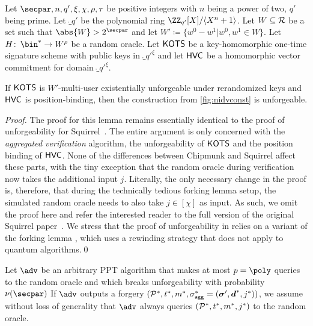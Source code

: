 \begin{lemma}\label{lem:msigunf}
Let $\secpar,n,q',\xi,\chi,\rho,\tau$ be positive integers with $n$ being a power of two, $q'$ being prime.
Let $\ring_{q'}$ be the polynomial ring $\defringqq$.
Let $W \subseteq \mathcal{R}$ be a set such that $\abs{W} > 2^\secpar$ and let $W' \coloneqq \{w^0-w^1| w^0,w^1 \in W\}$.
Let $H\colon\, \bin^* \to W^\rho$ be a random oracle.
Let $\mathsf{KOTS}$ be a key-homomorphic one-time signature scheme with public keys in $\ring_{q'}^\xi$ and let $\mathsf{HVC}$ be a homomorphic vector commitment for domain $\ring_{q'}^\xi$.

If $\mathsf{KOTS}$ is $W'$-multi-user existentially unforgeable under rerandomized keys and $\mathsf{HVC}$ is position-binding, then the construction from \autoref{fig:nidvconst} is unforgeable.
\end{lemma}

\begin{proof}
  The proof for this lemma remains essentially identical to the proof of unforgeability for Squirrel~\cite{CCS:FleSimZha22}.
  The entire argument is only concerned with the \emph{aggregated verification} algorithm, the unforgeability of $\mathsf{KOTS}$ and the position binding of $\mathsf{HVC}$.
  None of the differences between Chipmunk and Squirrel affect these parts, with the tiny exception that the random oracle during verification now takes the additional input $j$.
  Literally, the only necessary change in the proof is, therefore, that during the technically tedious forking lemma setup, the simulated random oracle needs to also take $j\in[\chi]$ as input.
  As such, we omit the proof here and refer the interested reader to the full version of the original Squirrel paper~\cite{EPRINT:FleSimZha22}.
  We stress that the proof of unforgeability in \cite{EPRINT:FleSimZha22} relies on a variant \cite{CCS:BelNev06} of the forking lemma \cite{EC:PoiSte96}, which uses a rewinding strategy that does not apply to quantum algorithms.\qed
\end{proof}


\iffalse
  Let $\adv$ be an arbitrary PPT algorithm that makes at most $p=\poly$ queries to the random oracle and which breaks unforgeability with probability $\nu(\secpar)$
  If $\adv$ outputs a forgery $(\mathcal{P}^*,t^*,m^*,\sigma_\mathsf{agg}^*=(\boldsymbol{\sigma}',\boldsymbol{d}^*,j^*))$, we assume without loss of generality that $\adv$ always queries $(\mathcal{P}^*,t^*,m^*,j^*)$ to the random oracle.
  
